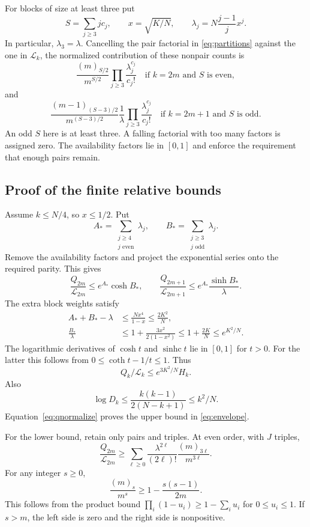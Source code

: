 \documentclass[11pt]{article}
\theoremstyle{definition}
\theoremstyle{remark}
\newcommand{\1}{\mathbf 1}
\newcommand{\shc}{\operatorname{sinhc}}
\begin{document}
For blocks of size at least three put
\[
S=\sum_{j\ge3}jc_j,\qquad x=\sqrt{K/N},\qquad
\lambda_j=N\frac{j-1}{j}x^j.
\]
In particular, $\lambda_3=\lambda$. Cancelling the pair factorial in \eqref{eq:partitions} against the one in $\mathcal L_k$, the normalized contribution of these nonpair counts is
\begin{equation}\label{eq:availabilityeven}
\frac{(m)_{S/2}}{m^{S/2}}
\prod_{j\ge3}\frac{\lambda_j^{c_j}}{c_j!}
\quad\text{if }k=2m\text{ and }S\text{ is even},
\end{equation}
and
\begin{equation}\label{eq:availabilityodd}
\frac{(m-1)_{(S-3)/2}}{m^{(S-3)/2}}
\frac1\lambda\prod_{j\ge3}\frac{\lambda_j^{c_j}}{c_j!}
\quad\text{if }k=2m+1\text{ and }S\text{ is odd}.
\end{equation}
An odd $S$ here is at least three. A falling factorial with too many factors is assigned zero. The availability factors lie in $[0,1]$ and enforce the requirement that enough pairs remain.

\subsection{Proof of the finite relative bounds}

Assume $k\le N/4$, so $x\le1/2$. Put
\[
A_* =\sum_{\substack{j\ge4\\j\text{ even}}}\lambda_j,
\qquad B_* =\sum_{\substack{j\ge3\\j\text{ odd}}}\lambda_j.
\]
Remove the availability factors and project the exponential series onto the required parity. This gives
\[
\frac{Q_{2m}}{\mathcal L_{2m}}\le e^{A_*}\cosh B_*,\qquad
\frac{Q_{2m+1}}{\mathcal L_{2m+1}}\le e^{A_*}\frac{\sinh B_*}{\lambda}.
\]
The extra block weights satisfy
\begin{align*}
A_*+B_*-\lambda&\le\frac{Nx^4}{1-x}\le\frac{2K^2}N,\\
\frac{B_*}{\lambda}&\le1+\frac{3x^2}{2(1-x^2)}
\le1+\frac{2K}N\le e^{K^2/N}.
\end{align*}
The logarithmic derivatives of $\cosh t$ and $\shc t$ lie in $[0,1]$ for $t>0$. For the latter this follows from $0\le\coth t-1/t\le1$. Thus
\[
Q_k/\mathcal L_k\le e^{3K^2/N}H_k.
\]
Also
\[
\log D_k\le\frac{k(k-1)}{2(N-k+1)}\le k^2/N.
\]
Equation~\eqref{eq:qnormalize} proves the upper bound in \eqref{eq:envelope}.

For the lower bound, retain only pairs and triples. At even order, with $J$ triples,
\[
\frac{Q_{2m}}{\mathcal L_{2m}}
\ge\sum_{\ell\ge0}\frac{\lambda^{2\ell}}{(2\ell)!}
\frac{(m)_{3\ell}}{m^{3\ell}}.
\]
For any integer $s\ge0$,
\[
\frac{(m)_s}{m^s}\ge1-\frac{s(s-1)}{2m}.
\]
This follows from the product bound $\prod_i(1-u_i)\ge1-\sum_i u_i$ for $0\le u_i\le1$. If $s>m$, the left side is zero and the right side is nonpositive.
\end{document}
